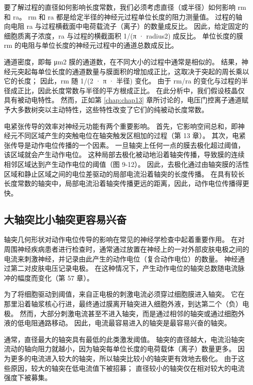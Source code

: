 要了解过程的直径如何影响长度常数，我们必须考虑直径（或半径）如何影响 rm 和 ra。 
rm 和 ra 都是给定半径的神经元过程单位长度的阻力测量值。 
过程的轴向电阻 ra 与过程横截面中电荷载流子（离子）的数量成反比。 
因此，给定固定的细胞质离子浓度，ra 与过程的横截面积 1/(π · radius2) 成反比。 
单位长度的膜 rm 的电阻与单位长度的神经元过程中的通道总数成反比。


通道密度，即每 μm2 膜的通道数，在不同大小的过程中通常是相似的。 
结果，神经元突起每单位长度的通道数量与膜面积的增加成正比，这取决于突起的周长乘以它的长度； 
因此，rm 随 1/(2 · π · 半径) 变化。 
由于 rm/ra 的变化与过程的半径成正比，因此长度常数与半径的平方根成正比。 
在此分析中，我们假设枝晶仅具有被动电特性。 
然而，正如第 \ref{chap:chap13} 章所讨论的，电压门控离子通道赋予大多数树突以主动特性，这些特性改变了它们的纯被动长度常数。


电紧张传导的效率对神经元功能有两个重要影响。 首先，它影响空间总和，即神经元不同区域产生的突触电位在轴突触发区相加的过程（第 13 章）。 其次，电紧张传导是动作电位传播的一个因素。 一旦轴突上任何一点的膜去极化超过阈值，该区域就会产生动作电位。 这种局部去极化被动地沿着轴突传播，导致膜的连续相邻区域达到产生动作电位的阈值（图 9-12）。 因此，去极化通过由轴突膜的活性区域和静止区域之间的电位差驱动的局部电流沿着轴突的长度传播。 在具有较长长度常数的轴突中，局部电流沿着轴突传播更远的距离，因此，动作电位传播得更快。


\subsection{大轴突比小轴突更容易兴奋}

轴突几何形状对动作电位传导的影响在常见的神经学检查中起着重要作用。 在对周围神经疾病患者进行检查时，通常通过放置在神经上的一对外部皮肤电极之间的电流来刺激神经，并记录由此产生的动作电位（复合动作电位）的数量。 神经通过第二对皮肤电压记录电极。 在这种情况下，产生动作电位的轴突总数随电流脉冲的幅度而变化（第 57 章）。

为了将细胞驱动到阈值，来自正电极的刺激电流必须穿过细胞膜进入轴突。 它在那里沿着轴浆核心行进，最终通过膜离开轴突进入细胞外液，到达第二个（负）电极。 然而，大部分刺激电流甚至不进入轴突，而是通过相邻的轴突或通过细胞外液的低电阻通路移动。 因此，电流最容易进入的轴突是最容易兴奋的轴突。

通常，直径最大的轴突具有最低的此类激发阈值。 轴突的直径越大，电流沿轴突流动的轴向阻力就越小，因为轴突每单位长度的电荷载体（离子）数量更多。 因为更多的电流进入较大的轴突，所以轴突比较小的轴突更有效地去极化。 由于这些原因，较大的轴突在低电流值下被招募； 直径较小的轴突仅在相对较大的电流强度下被募集。

